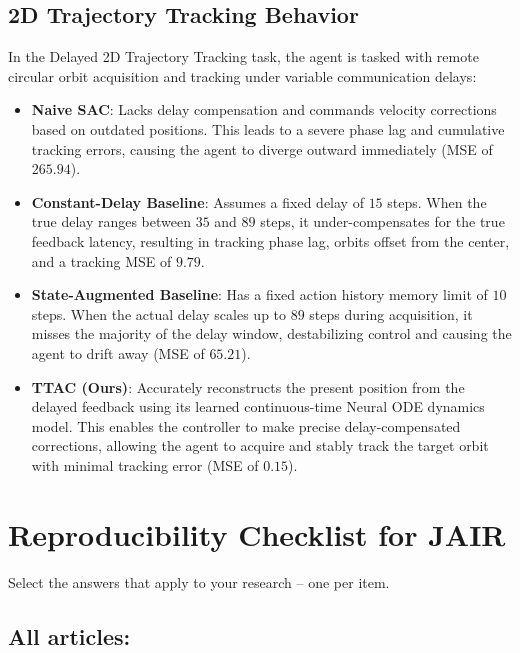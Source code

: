 \documentclass[manuscript, screen, review]{jair}
\begin{document}
\subsection{2D Trajectory Tracking Behavior}\label{app:sub_qualitative_tracking}
In the Delayed 2D Trajectory Tracking task, the agent is tasked with remote circular orbit acquisition and tracking under variable communication delays:
\begin{itemize}
    \item \textbf{Naive SAC}: Lacks delay compensation and commands velocity corrections based on outdated positions. This leads to a severe phase lag and cumulative tracking errors, causing the agent to diverge outward immediately (MSE of $265.94$).
    \item \textbf{Constant-Delay Baseline}: Assumes a fixed delay of $15$ steps. When the true delay ranges between $35$ and $89$ steps, it under-compensates for the true feedback latency, resulting in tracking phase lag, orbits offset from the center, and a tracking MSE of $9.79$.
    \item \textbf{State-Augmented Baseline}: Has a fixed action history memory limit of $10$ steps. When the actual delay scales up to $89$ steps during acquisition, it misses the majority of the delay window, destabilizing control and causing the agent to drift away (MSE of $65.21$).
    \item \textbf{TTAC (Ours)}: Accurately reconstructs the present position from the delayed feedback using its learned continuous-time Neural ODE dynamics model. This enables the controller to make precise delay-compensated corrections, allowing the agent to acquire and stably track the target orbit with minimal tracking error (MSE of $0.15$).
\end{itemize}

\section{Reproducibility Checklist for JAIR}\label{app:sec_checklist}

Select the answers that apply to your research -- one per item. 

\subsection*{All articles:}
\end{document}
